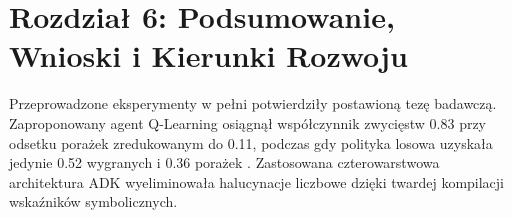 \documentclass[11pt,a4paper]{article}
\begin{document}
\section{Rozdział 6: Podsumowanie, Wnioski i Kierunki Rozwoju}
Przeprowadzone eksperymenty w pełni potwierdziły postawioną tezę badawczą. Zaproponowany agent Q-Learning osiągnął współczynnik zwycięstw 0.83 przy odsetku porażek zredukowanym do 0.11, podczas gdy polityka losowa uzyskała jedynie 0.52 wygranych i 0.36 porażek \cite{watkins1992qlearning,sutton2018reinforcement}. Zastosowana czterowarstwowa architektura ADK wyeliminowała halucynacje liczbowe dzięki twardej kompilacji wskaźników symbolicznych.



\end{document}
